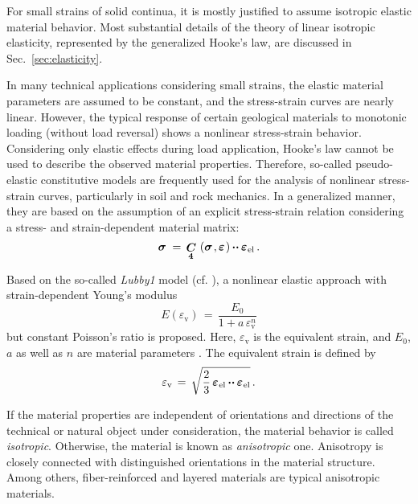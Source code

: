 For small strains of solid continua, it is mostly justified to assume isotropic elastic material behavior. Most substantial details of the theory of linear isotropic elasticity, represented by the generalized Hooke's law, are discussed in Sec.~\ref{sec:elasticity}.

In many technical applications considering small strains, the elastic material parameters are assumed to be constant, and the stress-strain curves are nearly linear. However, the typical response of certain geological materials to monotonic loading (without load reversal) shows a nonlinear stress-strain behavior. Considering only elastic effects during load application, Hooke's law cannot be used to describe the observed material properties. Therefore, so-called pseudo-elastic constitutive models are frequently used for the analysis of nonlinear stress-strain curves, particularly in soil and rock mechanics. In a generalized manner, they are based on the assumption of an explicit stress-strain relation considering a stress- and strain-dependent material matrix:
\begin{equation}
\mio{\sigma}{}{}\,=\,\fourtens{C}(\mio{\sigma}{}{},\mio{\varepsilon}{}{})\ccdot\miu{\varepsilon}{\mathrm{el}}{}\,.
\label{Me_elasticity_nonlin}
\end{equation}

Based on the so-called {\sl Lubby1} model (cf. \cite{Lux:1984}), a nonlinear elastic approach with strain-dependent Young's modulus
\begin{equation}
E(\varepsilon_{\mathrm{v}})\,=\,\frac{E_0}{1+a\,\varepsilon_{\mathrm{v}}^n}
\label{Me_lubby1_ev}
\end{equation}
but constant Poisson's ratio is proposed. Here, $\varepsilon_{\mathrm{v}}$ is the equivalent strain, and $E_0$, $a$ as well as $n$ are material parameters . The equivalent strain is defined by
\begin{equation}
\varepsilon_{\mathrm{v}}\,=\,
\sqrt{\frac{2}{3}\,\mbox{${\mbox{\boldmath${\varepsilon}$\unboldmath}}_{\:\!\mathrm{el}}$}\mbox{\,${\mbox{\boldmath$\cdot\cdot$\unboldmath}}$\,}\mbox{${\mbox{\boldmath${\varepsilon}$\unboldmath}}_{\:\!\mathrm{el}}$}}\,.
\end{equation}


If the material properties are independent of orientations and directions of the technical or natural object under consideration, the material behavior is called {\sl isotropic}. Otherwise, the material is known as {\sl anisotropic} one. Anisotropy is closely connected with distinguished orientations in the material structure. Among others, fiber-reinforced and layered materials are typical anisotropic materials.

